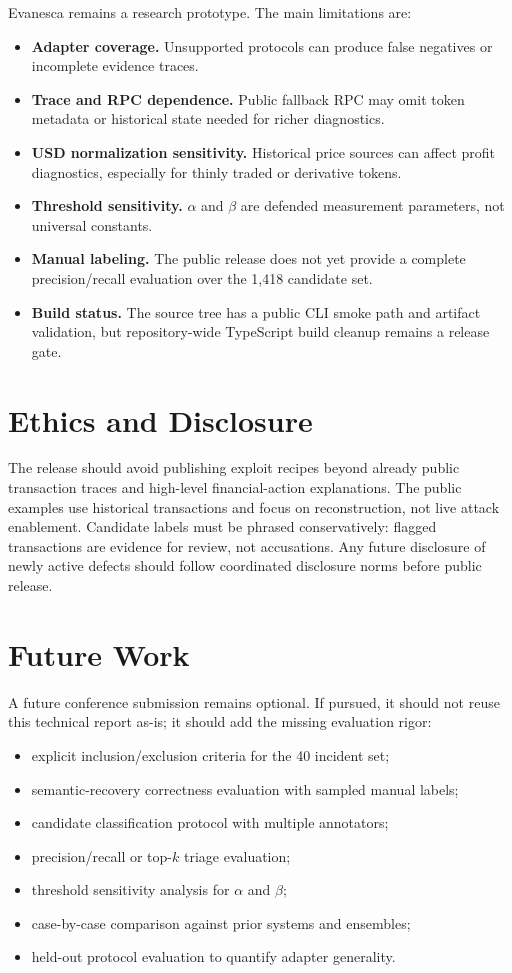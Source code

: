 \documentclass[10pt]{article}
\newcommand{\sys}{Evanesca\xspace}
\newcommand{\numincidents}{40\xspace}
\newcommand{\numflagged}{1,418\xspace}
\begin{document}
\sys remains a research prototype. The main limitations are:
\begin{itemize}
  \item \textbf{Adapter coverage.} Unsupported protocols can produce false
  negatives or incomplete evidence traces.
  \item \textbf{Trace and RPC dependence.} Public fallback RPC may omit token
  metadata or historical state needed for richer diagnostics.
  \item \textbf{USD normalization sensitivity.} Historical price sources can
  affect profit diagnostics, especially for thinly traded or derivative tokens.
  \item \textbf{Threshold sensitivity.} \(\alpha\) and \(\beta\) are defended
  measurement parameters, not universal constants.
  \item \textbf{Manual labeling.} The public release does not yet provide a
  complete precision/recall evaluation over the \numflagged candidate set.
  \item \textbf{Build status.} The source tree has a public CLI smoke path and
  artifact validation, but repository-wide TypeScript build cleanup remains a
  release gate.
\end{itemize}

\section{Ethics and Disclosure}
\label{sec:ethics}

The release should avoid publishing exploit recipes beyond already public
transaction traces and high-level financial-action explanations. The public
examples use historical transactions and focus on reconstruction, not live
attack enablement. Candidate labels must be phrased conservatively: flagged
transactions are evidence for review, not accusations. Any future disclosure of
newly active defects should follow coordinated disclosure norms before public
release.

\section{Future Work}
\label{sec:future}

A future conference submission remains optional. If pursued, it should not
reuse this technical report as-is; it should add the missing evaluation rigor:
\begin{itemize}
  \item explicit inclusion/exclusion criteria for the \numincidents incident set;
  \item semantic-recovery correctness evaluation with sampled manual labels;
  \item candidate classification protocol with multiple annotators;
  \item precision/recall or top-\(k\) triage evaluation;
  \item threshold sensitivity analysis for \(\alpha\) and \(\beta\);
  \item case-by-case comparison against prior systems and ensembles;
  \item held-out protocol evaluation to quantify adapter generality.
\end{itemize}
\end{document}
